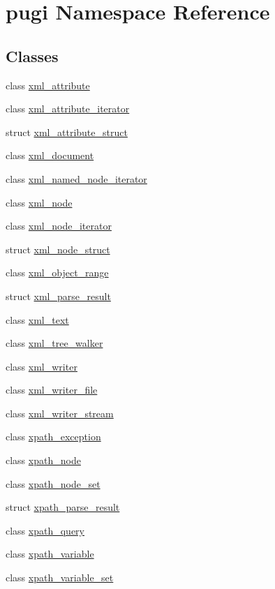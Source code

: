 \hypertarget{namespacepugi}{}\section{pugi Namespace Reference}
\label{namespacepugi}
\subsection*{Classes}
\begin{DoxyCompactItemize}
\item 
class \hyperlink{classpugi_1_1xml__attribute}{xml\+\_\+attribute}
\item 
class \hyperlink{classpugi_1_1xml__attribute__iterator}{xml\+\_\+attribute\+\_\+iterator}
\item 
struct \hyperlink{structpugi_1_1xml__attribute__struct}{xml\+\_\+attribute\+\_\+struct}
\item 
class \hyperlink{classpugi_1_1xml__document}{xml\+\_\+document}
\item 
class \hyperlink{classpugi_1_1xml__named__node__iterator}{xml\+\_\+named\+\_\+node\+\_\+iterator}
\item 
class \hyperlink{classpugi_1_1xml__node}{xml\+\_\+node}
\item 
class \hyperlink{classpugi_1_1xml__node__iterator}{xml\+\_\+node\+\_\+iterator}
\item 
struct \hyperlink{structpugi_1_1xml__node__struct}{xml\+\_\+node\+\_\+struct}
\item 
class \hyperlink{classpugi_1_1xml__object__range}{xml\+\_\+object\+\_\+range}
\item 
struct \hyperlink{structpugi_1_1xml__parse__result}{xml\+\_\+parse\+\_\+result}
\item 
class \hyperlink{classpugi_1_1xml__text}{xml\+\_\+text}
\item 
class \hyperlink{classpugi_1_1xml__tree__walker}{xml\+\_\+tree\+\_\+walker}
\item 
class \hyperlink{classpugi_1_1xml__writer}{xml\+\_\+writer}
\item 
class \hyperlink{classpugi_1_1xml__writer__file}{xml\+\_\+writer\+\_\+file}
\item 
class \hyperlink{classpugi_1_1xml__writer__stream}{xml\+\_\+writer\+\_\+stream}
\item 
class \hyperlink{classpugi_1_1xpath__exception}{xpath\+\_\+exception}
\item 
class \hyperlink{classpugi_1_1xpath__node}{xpath\+\_\+node}
\item 
class \hyperlink{classpugi_1_1xpath__node__set}{xpath\+\_\+node\+\_\+set}
\item 
struct \hyperlink{structpugi_1_1xpath__parse__result}{xpath\+\_\+parse\+\_\+result}
\item 
class \hyperlink{classpugi_1_1xpath__query}{xpath\+\_\+query}
\item 
class \hyperlink{classpugi_1_1xpath__variable}{xpath\+\_\+variable}
\item 
class \hyperlink{classpugi_1_1xpath__variable__set}{xpath\+\_\+variable\+\_\+set}
\end{DoxyCompactItemize}
